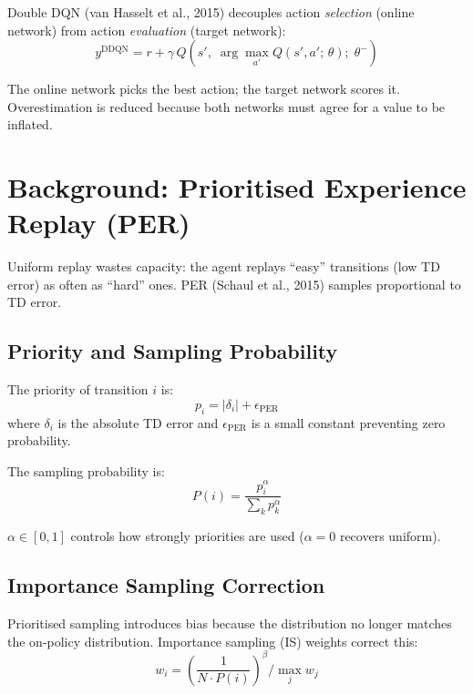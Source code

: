 \documentclass[12pt]{article}
\begin{document}
Double DQN (van Hasselt et al., 2015) decouples action \emph{selection} (online network)
from action \emph{evaluation} (target network):
\begin{equation}
  y^{\text{DDQN}} = r + \gamma\, Q\!\left(s',\; \arg\max_{a'} Q(s',a';\,\theta);\; \theta^-\right)
\end{equation}

The online network picks the best action; the target network scores it.
Overestimation is reduced because both networks must agree for a value to be inflated.

\section{Background: Prioritised Experience Replay (PER)}

Uniform replay wastes capacity: the agent replays ``easy'' transitions (low TD error)
as often as ``hard'' ones. PER (Schaul et al., 2015) samples proportional to TD error.

\subsection{Priority and Sampling Probability}

The priority of transition $i$ is:
\begin{equation}
  p_i = |\delta_i| + \epsilon_{\text{PER}}
\end{equation}
where $\delta_i$ is the absolute TD error and $\epsilon_{\text{PER}}$ is a small constant
preventing zero probability.

The sampling probability is:
\begin{equation}
  P(i) = \frac{p_i^\alpha}{\sum_k p_k^\alpha}
\end{equation}

$\alpha \in [0,1]$ controls how strongly priorities are used ($\alpha = 0$ recovers uniform).

\subsection{Importance Sampling Correction}

Prioritised sampling introduces bias because the distribution no longer matches the
on-policy distribution. Importance sampling (IS) weights correct this:
\begin{equation}
  w_i = \left(\frac{1}{N \cdot P(i)}\right)^{\!\beta}
  \Big/ \max_j w_j
\end{equation}
\end{document}
